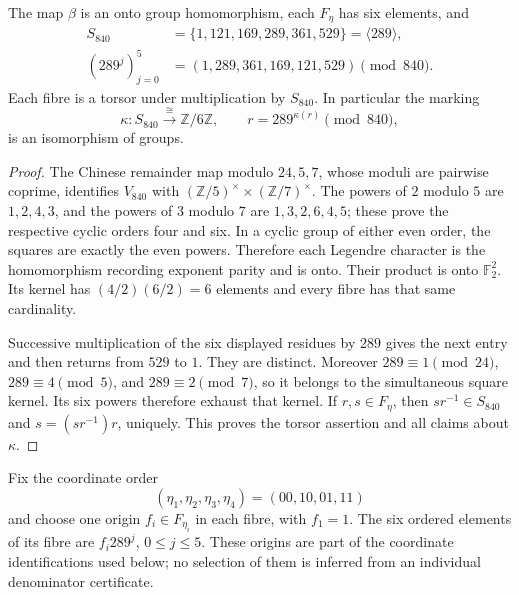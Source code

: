 \begin{theorem}
\label{esn:thm:cyclic-fibre}
The map \(\beta\) is an onto group homomorphism, each \(F_\eta\) has
six elements, and
\begin{equation}
 \begin{split}
 S_{840}&=\{1,121,169,289,361,529\}=\langle289\rangle,\\
 (289^j)_{j=0}^5&=(1,289,361,169,121,529)\pmod {840}.
 \end{split}
 \label{esn:eq:ordered-fibre}
\end{equation}
Each fibre is a torsor under multiplication by \(S_{840}\).  In
particular the marking
\begin{equation}
 \kappa:S_{840}\xrightarrow{\ \cong\ }\mathbb Z/6\mathbb Z,
 \qquad r=289^{\kappa(r)}\pmod {840},
 \label{esn:eq:kappa}
\end{equation}
is an isomorphism of groups.
\end{theorem}

\begin{proof}
The Chinese remainder map modulo \(24,5,7\), whose moduli are pairwise
coprime, identifies \(V_{840}\) with
\((\mathbb Z/5)^\times\times(\mathbb Z/7)^\times\).  The powers of
\(2\) modulo \(5\) are \(1,2,4,3\), and the powers of \(3\) modulo
\(7\) are \(1,3,2,6,4,5\); these prove the respective cyclic orders
four and six.  In a cyclic group of either even order, the squares are
exactly the even powers.  Therefore each Legendre character is the
homomorphism recording exponent parity and is onto.  Their product is
onto \(\mathbb F_2^2\).  Its kernel has
\((4/2)(6/2)=6\) elements and every fibre has that same cardinality.

Successive multiplication of the six displayed residues by \(289\)
gives the next entry and then returns from \(529\) to \(1\).
They are distinct.  Moreover \(289\equiv1\pmod {24}\),
\(289\equiv4\pmod5\), and \(289\equiv2\pmod7\), so it belongs to
the simultaneous square kernel.  Its six powers therefore exhaust that
kernel.  If \(r,s\in F_\eta\), then \(sr^{-1}\in S_{840}\) and
\(s=(sr^{-1})r\), uniquely.  This proves the torsor assertion and all
claims about \(\kappa\).
\end{proof}

Fix the coordinate order
\[
 (\eta_1,\eta_2,\eta_3,\eta_4)=(00,10,01,11)
\]
and choose one origin \(f_i\in F_{\eta_i}\) in each fibre, with
\(f_1=1\).  The six ordered elements of its fibre are
\(f_i289^j\), \(0\le j\le5\).  These origins are part of the
coordinate identifications used below; no selection of them is inferred
from an individual denominator certificate.

